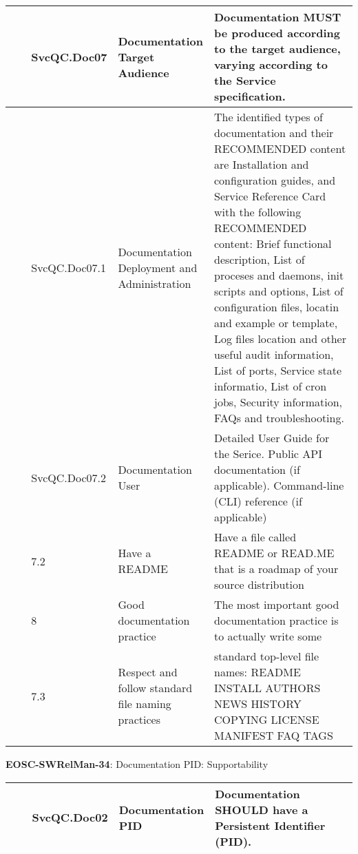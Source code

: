 \begin{center}
\begin{supertabular}{|p{0.10\linewidth}|p{0.10\linewidth}|p{0.20\linewidth}|p{0.60\linewidth}|}
        \cite{orviz_fernandez_eosc-synergy_2020} & SvcQC.Doc07 & Documentation Target Audience & Documentation MUST be produced according to the target audience, varying according to the Service specification.\\ \hline
        \cite{orviz_fernandez_eosc-synergy_2020} & SvcQC.Doc07.1 & Documentation Deployment and Administration & The identified types of documentation and their RECOMMENDED content are Installation and configuration guides, and Service Reference Card with the following RECOMMENDED content: Brief functional description, List of proceses and daemons, init scripts and options, List of configuration files, locatin and example or template, Log files location and other useful audit information, List of ports, Service state informatio, List of cron jobs, Security information, FAQs and troubleshooting.\\ \hline
        \cite{orviz_fernandez_eosc-synergy_2020} & SvcQC.Doc07.2 & Documentation User & Detailed User Guide for the Serice. Public API documentation (if applicable). Command-line (CLI) reference (if applicable)\\ \hline
        \cite{raymond_software_2013} & 7.2 & Have a README & Have a file called README or READ.ME that is a roadmap of your source distribution\\ \hline
        \cite{raymond_software_2013} & 8 & Good documentation practice & The most important good documentation practice is to actually write some\\ \hline
        \cite{raymond_software_2013} & 7.3 & Respect and follow standard file naming practices & standard top-level file names: README INSTALL AUTHORS NEWS HISTORY COPYING LICENSE MANIFEST FAQ TAGS\\ \hline
    \end{supertabular}
\end{center}

\textbf{EOSC-SWRelMan-34}: Documentation PID: Supportability
\nopagebreak[4]
\begin{center}
    \tabletail{\hline}
    \tiny
    \begin{supertabular}{|p{0.10\linewidth}|p{0.10\linewidth}|p{0.20\linewidth}|p{0.60\linewidth}|} \hline
        \cite{orviz_fernandez_eosc-synergy_2020} & SvcQC.Doc02 & Documentation PID & Documentation SHOULD have a Persistent Identifier (PID).\\ \hline
    \end{supertabular}
\end{center}

